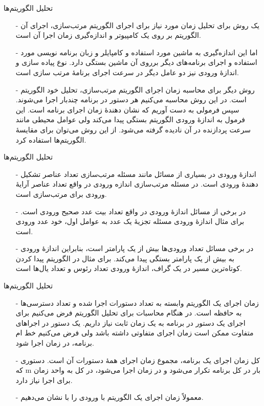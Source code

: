 \begin{frame}{‌‌تحلیل الگوریتم‌ها}
\begin{itemize}\itemr
\item[-]
یک روش برای تحلیل زمان مورد نیاز برای اجرای الگوریتم مرتب‌سازی، اجرای آن الگوریتم بر روی یک کامپیوتر و اندازه‌گیری زمان اجرا آن است.
\item[-]
اما این اندازه‌گیری به ماشین مورد استفاده و کامپایلر و زبان برنامه نویسی مورد استفاده و اجرای برنامه‌های دیگر برروی آن ماشین بستگی دارد. نوع پیاده سازی و اندازهٔ ورودی نیز دو عامل دیگر در سرعت اجرای برنامهٔ مرتب سازی است.
\item[-]
روش دیگر برای محاسبه زمان اجرای الگوریتم مرتب‌سازی، تحلیل خود الگوریتم است. در این روش محاسبه می‌کنیم هر دستور در برنامه چندبار اجرا می‌شوند. سپس فرمولی به دست آوریم که نشان دهندهٔ زمان اجرای برنامه است. این فرمول به اندازهٔ ورودی الگوریتم بستگی پیدا می‌کند ولی عوامل محیطی مانند سرعت پردازنده در آن نادیده گرفته می‌شود. از این روش می‌توان برای مقایسهٔ الگوریتم‌ها استفاده کرد.
\end{itemize}
\end{frame}


\begin{frame}{‌تحلیل الگوریتم‌ها}
\begin{itemize}\itemr
\item[-]
اندازهٔ ورودی
در بسیاری از مسائل مانند مسئله مرتب‌سازی تعداد عناصر تشکیل دهندهٔ ورودی است.
در مسئله مرتب‌سازی اندازه ورودی در واقع تعداد عناصر آرایهٔ ورودی برای مرتب‌سازی است.
\item[-]
در برخی از مسائل اندازهٔ ورودی در واقع تعداد بیت عدد صحیح ورودی است. برای مثال اندازهٔ ورودی مسئله تجزیهٔ یک عدد به عوامل اول، خود عدد ورودی است.
\item[-]
در برخی مسائل تعداد ورودی‌ها بیش از یک پارامتر است، بنابراین اندازهٔ ورودی به بیش از یک پارامتر بستگی پیدا می‌کند. برای مثال در الگوریتم پیدا کردن کوتاه‌ترین مسیر در یک گراف، اندازهٔ ورودی تعداد رئوس و تعداد یال‌ها است.
\end{itemize}
\end{frame}


\begin{frame}{‌‌تحلیل الگوریتم‌ها}
\begin{itemize}\itemr
\item[-]
زمان اجرای
یک الگوریتم وابسته به تعداد دستورات اجرا شده و تعداد دسترسی‌ها به حافظه است.
در هنگام محاسبات برای تحلیل الگوریتم فرض می‌کنیم برای اجرای یک دستور در برنامه به یک زمان ثابت نیاز داریم.
یک دستور در اجراهای متفاوت ممکن است زمان اجرای متفاوتی داشته باشد ولی فرض می‌کنیم خط
ام برنامه، در زمان
اجرا شود.
\item[-]
کل زمان اجرای یک برنامه، مجموع زمان اجرای همهٔ دستورات آن است. دستوری که m بار در کل برنامه تکرار می‌شود و در زمان
 اجرا می‌شود، در کل به
واحد زمان برای اجرا نیاز دارد.
\item[-]
معمولاً زمان اجرای یک الگوریتم با ورودی
را با
نشان می‌دهیم.
\end{itemize}
\end{frame}



